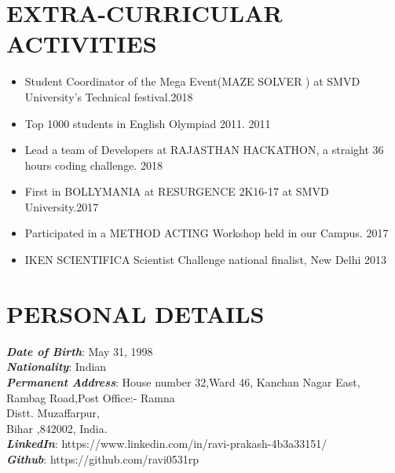 \documentclass[margin]{res}
\begin{document}
\begin{resume}
\section{EXTRA-CURRICULAR ACTIVITIES}

\begin{itemize}  \setlength\itemsep{-0.00em}
\item Student Coordinator of the Mega Event(MAZE SOLVER ) at SMVD University's Technical festival.\hfill{2018}
\item Top 1000 students in English Olympiad 2011. \hfill {2011}
\item Lead a team of Developers at RAJASTHAN HACKATHON, a straight 36 hours coding challenge. \hfill{2018}
\item First in BOLLYMANIA at RESURGENCE 2K16-17 at SMVD University.\hfill{2017}
\item Participated in a  METHOD ACTING Workshop held in our Campus. \hfill{2017}
\item IKEN SCIENTIFICA Scientist Challenge national finalist, New Delhi  \hfill{2013}

\end{itemize}

\section{PERSONAL DETAILS}

{\sl{\textbf{Date of Birth}\hspace{56pt}}}: May 31, 1998\\
{\sl\textbf{Nationality}\hspace{68pt}}: Indian\\
{\sl\textbf{Permanent Address}\hspace{25pt}}: House number 32,Ward 46, Kanchan Nagar East,\\ \hspace*{46mm}Rambag Road,Post Office:- Ramna\\
 \hspace*{46mm}Distt. Muzaffarpur,\\\hspace*{45mm}
Bihar ,842002, India. \\
{\sl{\textbf{LinkedIn}\hspace{80pt}}}: https://www.linkedin.com/in/ravi-prakash-4b3a33151/\\
{\sl{\textbf{Github}\hspace{89pt}}}: https://github.com/ravi0531rp\\
\end{resume}
\end{document}
